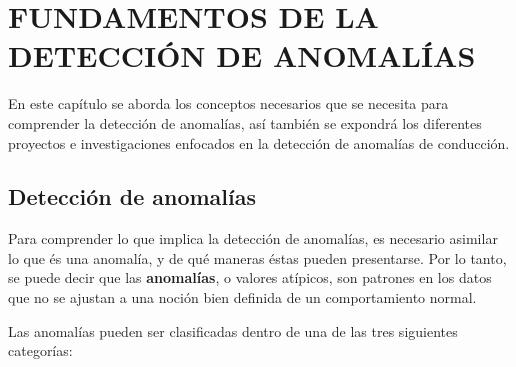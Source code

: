 
\chapter{\uppercase{Fundamentos de la detecci\'{o}n de anomal\'{i}as}}

\label{Capitulo 2}

En este cap\'{i}tulo se aborda los conceptos necesarios que se necesita para comprender la detecci\'{o}n de anomal\'{i}as, as\'{i} tambi\'{e}n se expondr\'{a} los diferentes proyectos e investigaciones enfocados en la detecci\'{o}n de anomal\'{i}as de conducci\'{o}n. 
 
\section{Detecci\'{o}n de anomal\'{i}as}

Para comprender lo que implica la detecci\'{o}n de anomal\'{i}as, es necesario asimilar lo que \'{e}s una anomal\'{i}a, y de qu\'{e} maneras \'{e}stas pueden presentarse. Por lo tanto, se puede decir que las \textbf{anomalías}, o valores at\'{i}picos, son patrones en los datos que no se ajustan a una noción bien definida de un comportamiento normal.

\vspace{5mm} %

Las anomal\'{i}as pueden ser clasificadas dentro de una de las tres siguientes categor\'{i}as:

